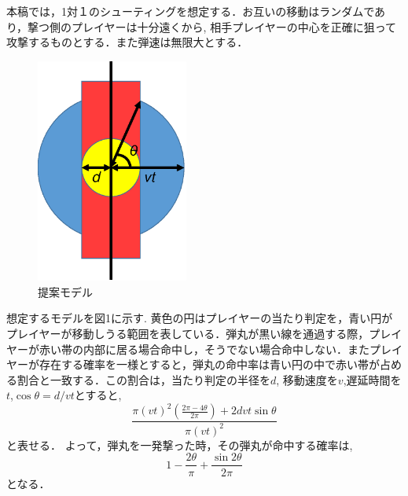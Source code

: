 \documentclass[a4j]{jarticle}
\begin{document}
本稿では，1対１のシューティングを想定する．お互いの移動はランダムであり，撃つ側のプレイヤーは十分遠くから, 相手プレイヤーの中心を正確に狙って攻撃するものとする．また弾速は無限大とする．

\begin{figure}[tb]
\begin{center}
	\includegraphics[width=5.0cm]{モデル図.eps}
	\caption{提案モデル}
\end{center}
\end{figure}

想定するモデルを図1に示す. 黄色の円はプレイヤーの当たり判定を，青い円がプレイヤーが移動しうる範囲を表している．弾丸が黒い線を通過する際，プレイヤーが赤い帯の内部に居る場合命中し，そうでない場合命中しない．またプレイヤーが存在する確率を一様とすると，弾丸の命中率は青い円の中で赤い帯が占める割合と一致する．この割合は，当たり判定の半径を$d$, 移動速度を$v$,遅延時間を$t$,$\cos \theta = d/v t$とすると, 
\begin{equation}
\frac{\pi(vt)^2(\frac{2\pi-4\theta}{2\pi})+2dvt\sin\theta}{\pi (vt)^2}
\end{equation}
と表せる．
よって，弾丸を一発撃った時，その弾丸が命中する確率は,  
\begin{equation}
1-\frac{2\theta}{\pi}+\frac{\sin2\theta}{2\pi}
\end{equation}
となる．
\end{document}
